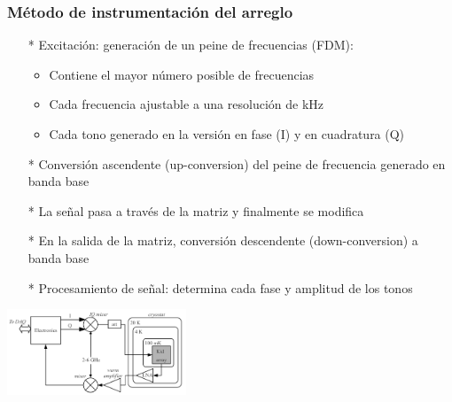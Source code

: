 \documentclass{beamer}
\begin{document}
\begin{frame}
				\end{frame} 

				\begin{frame}
								\frametitle{Método de instrumentación del arreglo}
								\begin{itemize}
												\item[*] Excitación: generación de un peine de
																frecuencias (\alert{FDM}):
																\begin{itemize}
																				\item Contiene el mayor número posible de frecuencias
																				\item Cada frecuencia ajustable a una resolución de kHz
																				\item Cada tono generado en la versión
																								en fase (I) y en cuadratura (Q)
																\end{itemize}

												\item[*] Conversión ascendente (up-conversion) del peine de frecuencia generado en banda base
												\item[*] La señal pasa a través de la matriz y finalmente se modifica
												\item[*] En la salida de la matriz, conversión
																descendente (down-conversion) a banda base
												\item[*] Procesamiento de señal: determina cada fase y
																amplitud de los tonos
								\end{itemize}
												\begin{center}
																\includegraphics[height=0.3\textheight,width=0.4\textwidth]{mkid_readout}
												\end{center}
				\end{frame} 

\end{document}
